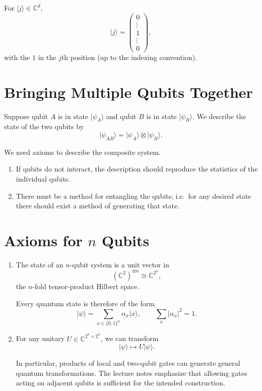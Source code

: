 \documentclass[11pt]{article}
\newcommand{\ket}[1]{\lvert #1\rangle}
\newcommand{\C}{\mathbb{C}}
\begin{document}
For $\ket{j}\in\C^d$,
\[
  \ket{j}
  =
  \begin{pmatrix}
    0\\
    \vdots\\
    1\\
    \vdots\\
    0
  \end{pmatrix},
\]
with the $1$ in the $j$th position (up to the indexing convention).

\section{Bringing Multiple Qubits Together}

Suppose qubit $A$ is in state $\ket{\psi_A}$ and qubit $B$ is in state
$\ket{\psi_B}$. We describe the state of the two qubits by
\[
  \ket{\psi_{AB}}
  =
  \ket{\psi_A}\otimes\ket{\psi_B}.
\]

We need axioms to describe the composite system.

\begin{enumerate}
  \item If qubits do not interact, the description should reproduce the
        statistics of the individual qubits.
  \item There must be a method for entangling the qubits; i.e.\ for any
        desired state there should exist a method of generating that state.
\end{enumerate}

\section{Axioms for $n$ Qubits}

\begin{enumerate}
  \item The state of an $n$-qubit system is a unit vector in
  \[
    (\C^2)^{\otimes n}
    \cong \C^{2^n},
  \]
  the $n$-fold tensor-product Hilbert space.

  Every quantum state is therefore of the form
  \[
    \ket{\psi}
    =
    \sum_{x\in\{0,1\}^n}\alpha_x\ket{x},
    \qquad
    \sum_x|\alpha_x|^2=1.
  \]

  \item For any unitary $U\in\C^{2^n\times2^n}$, we can transform
  \[
    \ket{\psi}\longmapsto U\ket{\psi}.
  \]

  In particular, products of local and two-qubit gates can generate
  general quantum transformations. The lecture notes emphasize that
  allowing gates acting on adjacent qubits is sufficient for the intended
  construction.

\end{enumerate}
\end{document}
